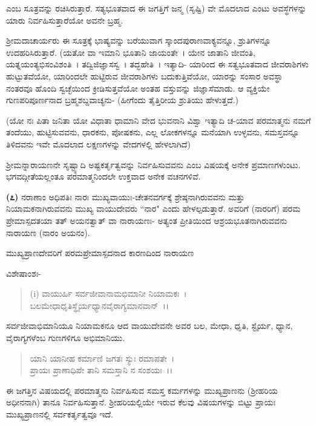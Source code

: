 ಎಂಬ ಸೂತ್ರವನ್ನು ರಚಿಸಿರುತ್ತಾರೆ. ಸತ್ಯಭೂತವಾದ ಈ ಜಗತ್ತಿಗೆ ಜನ್ಮ (ಸೃಷ್ಟಿ) ವೇ ಮೊದಲಾದ ಎಂಟು ಅವಸ್ಥೆಗಳನ್ನು ಯಾರು ನಿರ್ವಹಿಸುತ್ತಾರೆಯೋ ಅವನೇ ಬ್ರಹ್ಮ.

ಶ‍್ರೀಮದಾಚಾರ್ಯರು ಈ ಸೂತ್ರಕ್ಕೆ ಭಾಷ್ಯವನ್ನು ಬರೆಯುವಾಗ ಸ್ಕಾಂದಪುರಾಣವಾಕ್ಯವನ್ನೂ, ಶ್ರುತಿಗಳನ್ನೂ ಉದಹರಿಸಿರುತ್ತಾರೆ. (ಯತೋ ವಾ ಇಮಾನಿ ಭೂತಾನಿ ಜಾಯಂತೇ~। ಯೇನ ಜಾತಾನಿ ಜೀವಂತಿ, ಯತ್ನಯಂತ್ಯಭಿಸಂವಿಶಂತಿ~। ತದ್ವಿಜಿಜ್ಞಾಸಸ್ವ~। ತದ್ಭಹೇತಿ~। ಇತ್ಯಾದಿ- ಯಾರಿಂದ ಈ ಸತ್ವಭೂತವಾದ ಜೀವರಾಶಿಗಳು ಹುಟ್ಟುತವೆಯೋ, ಯಾರಿಂದಲೇ ಹುಟ್ಟಿರುವ ಜೀವರಾಶಿಗಳು ಬದುಕುತ್ತಿವೆಯೋ, ಯಾರನ್ನು ಸಂಸಾರ ಅವಸ್ಥಾ ನಂತರವೂ ಹೊಂದಿ ಸ್ವಚ್ಛೆಯಿಂದ ಕ್ರೀಡಿಸುತ್ತವೆಯೋ ಅಂತಹ ವಸ್ತುವನ್ನು ಜಿಜ್ಞಾಸೆಮಾಡು. ಆ ವ್ಯಕ್ತಿಯೇ ಗುಣಪರಿಪೂರ್ಣನಾದ ಬ್ರಹ್ಮಶಬ್ದವಾಚ್ಯನು- (ಹೀಗೆಂದು ತೈತ್ತಿರೀಯ ಶ್ರುತಿಯು ಹೇಳುತ್ತದೆ.)

(ಯೋ ನಃ ಪಿತಾ ಜನಿತಾ ಯೋ ವಿಧಾತಾ ಧಾಮಾನಿ ವೇದ ಭುವನಾನಿ ವಿಶ್ವಾ ಇತ್ಯಾದಿ ಚ-ಯಾವ ಪರಮಾತ್ಮನು ನಮಗೆ ತಂದೆಯು, ಹುಟ್ಟಿಸುವವನು, ಧಾರಕನು, ಪೋಷಕನು, ಎಲ್ಲ ಲೋಕಗಳನ್ನೂ ಮನೆಯಾಗಿ ಉಳ್ಳವನು, ಸಮಸ್ತವನ್ನೂ ತಿಳಿದವನು ಇವೇ ಮೊದಲಾದ ಲಕ್ಷಣಗಳನ್ನು ವೇದಗಳಲ್ಲಿ ಹೇಳಲಾಗಿದೆ)

ಶ‍್ರೀಮನ್ನಾರಾಯಣನೇ ಸೃಷ್ಟ್ಯಾದಿ ಅಷ್ಟಕರ್ತೃತ್ವವನ್ನು ನಿರ್ವಹಿಸುವವನು ಎಂಬ ವಿಷಯಕ್ಕೆ ಅನೇಕ ಪ್ರಮಾಣಗಳುಂಟು. ಭಗವದ್ಗೀತೆಯಲ್ಲಂತೂ ಪರಮಾತ್ಮನಿಂದಲೇ ಉಕ್ತವಾದ ಅನೇಕ ವಚನಗಳಿವೆ.

\textbf{(೭)} ನರಾಣಾಂ ಅಧಿಪತಿಃ ನಾರಃ ಮುಖ್ಯವಾಯುಃ-ಚೇತನವರ್ಗಕ್ಕೆ ಶ್ರೇಷ್ಠನಾಗಿರುವವನು ಮತ್ತು ನಿಯಾಮಕನಾಗಿರುವವನು ಮುಖ್ಯ ವಾಯುದೇವರು ``ನಾರ" ಎಂದು ಹೇಳಲ್ಪಡುತ್ತಾರೆ. ಅವರಿಗೆ (ನಾರರಿಗೆ) ಪರಮ ಪ್ರೇಮಾಸ್ಪದತಯಾ ತತ್ ಅಯನತ್ವಾತ್ ವಾ ನಾರಾಯಣಃ- ಅತ್ಯಂತ ಪ್ರೀತಿಯಿಂದ ಆಶ್ರಯಭೂತನಾಗಿರುವವನು ನಾರಾಯಣ (ನಾರಂ ಅಯನಂ).

\begin{center}
ಮುಖ್ಯಪ್ರಾಣದೇವರಿಗೆ ಪರಮಪ್ರೇಮಾಸ್ಪದನಾದ ಕಾರಣದಿಂದ ನಾರಾಯಣ
\end{center}

\noindent
ವಿಶೇಷಾಂಶಃ-

\begin{verse}
(i) ವಾಯುರ್ಹಿ ಸರ್ವಜೀವಾನಾಮಭಿಮಾನೀ ನಿಯಾಮಕಃ~।\\ ಬಲಮೇಧಾಧೃತಿಸ್ಥೈರ್ಯಧ್ಯಾನವೈರಾಗ್ಯಮಾನವಾನ್~।।
\end{verse}


ಸರ್ವಜೀವಾಭಿಮಾನಿಯೂ ನಿಯಾಮಕನೂ ಆದ ವಾಯುದೇವನೇ ಅವರ ಬಲ, ಮೇಧಾ, ಧೃತಿ, ಸ್ಟೈರ್ಯ, ಧ್ಯಾನ, ವೈರಾಗ್ಯಗಳೆಂಬ ಗುಣಗಳಿಗೂ ಅಭಿಮಾನಿಯು.

\begin{verse}
ಯಾನಿ ಯಾನೀಹ ಕರ್ಮಾಣಿ ಜಗತಃ ಸ್ಯುಃ ರಮಾಪತೇ~।\\ ಪ್ರಾಯಃ ಪ್ರಾಣಾಧಿಪೇ ತಾನಿ ಸಮಸ್ತಾನಿ ನ ಸಂಶಯಃ~।।
\end{verse}


ಈ ಜಗತ್ತಿನ ವಿಷಯದಲ್ಲಿ ಪರಮಾತ್ಮನು ನಿರ್ವಹಿಸುವ ಸಮಸ್ತ ಕರ್ಮಗಳನ್ನು ಮುಖ್ಯಪ್ರಾಣನು (ಶ‍್ರೀಹರಿಯ ಅಧೀನನಾಗಿ) ತಾನೂ ನಿರ್ವಹಿಸುತ್ತಾನೆ. ಶ‍್ರೀಹರಿಯಲ್ಲಿಯೇ ಇರುವ ಕೆಲವು ವಿಷಯಗಳನ್ನು ಬಿಟ್ಟು ಪ್ರಾಯಃ ಮುಖ್ಯಪ್ರಾಣನಲ್ಲಿ ಸರ್ವಕರ್ತೃತ್ವವೂ ಇದೆ.

